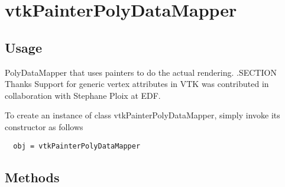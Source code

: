 \section{vtkPainterPolyDataMapper}

\subsection{Usage}

 PolyDataMapper that uses painters to do the actual rendering.
 .SECTION Thanks
 Support for generic vertex attributes in VTK was contributed in
 collaboration with Stephane Ploix at EDF.

To create an instance of class vtkPainterPolyDataMapper, simply
invoke its constructor as follows
\begin{verbatim}
  obj = vtkPainterPolyDataMapper
\end{verbatim}
\subsection{Methods}

